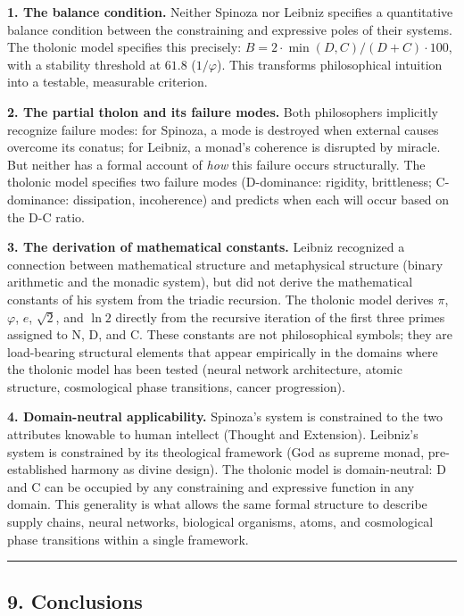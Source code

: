 \documentclass[
  11pt,
  letterpaper,
]{article}
\begin{document}
\textbf{1. The balance condition.} Neither Spinoza nor Leibniz specifies
a quantitative balance condition between the constraining and expressive
poles of their systems. The tholonic model specifies this precisely:
\(B = 2 \cdot \min(D,C)/(D+C) \cdot 100\), with a stability threshold at
\(61.8\) (\(1/\varphi\)). This transforms philosophical intuition into a
testable, measurable criterion.

\textbf{2. The partial tholon and its failure modes.} Both philosophers
implicitly recognize failure modes: for Spinoza, a mode is destroyed
when external causes overcome its conatus; for Leibniz, a monad's
coherence is disrupted by miracle. But neither has a formal account of
\emph{how} this failure occurs structurally. The tholonic model
specifies two failure modes (D-dominance: rigidity, brittleness;
C-dominance: dissipation, incoherence) and predicts when each will occur
based on the D-C ratio.

\textbf{3. The derivation of mathematical constants.} Leibniz recognized
a connection between mathematical structure and metaphysical structure
(binary arithmetic and the monadic system), but did not derive the
mathematical constants of his system from the triadic recursion. The
tholonic model derives \(\pi\), \(\varphi\), \(e\), \(\sqrt{2}\), and
\(\ln 2\) directly from the recursive iteration of the first three
primes assigned to N, D, and C. These constants are not philosophical
symbols; they are load-bearing structural elements that appear
empirically in the domains where the tholonic model has been tested
(neural network architecture, atomic structure, cosmological phase
transitions, cancer progression).

\textbf{4. Domain-neutral applicability.} Spinoza's system is
constrained to the two attributes knowable to human intellect (Thought
and Extension). Leibniz's system is constrained by its theological
framework (God as supreme monad, pre-established harmony as divine
design). The tholonic model is domain-neutral: D and C can be occupied
by any constraining and expressive function in any domain. This
generality is what allows the same formal structure to describe supply
chains, neural networks, biological organisms, atoms, and cosmological
phase transitions within a single framework.

\begin{center}\rule{0.5\linewidth}{0.5pt}\end{center}

\subsection{9. Conclusions}\label{conclusions}
\end{document}
